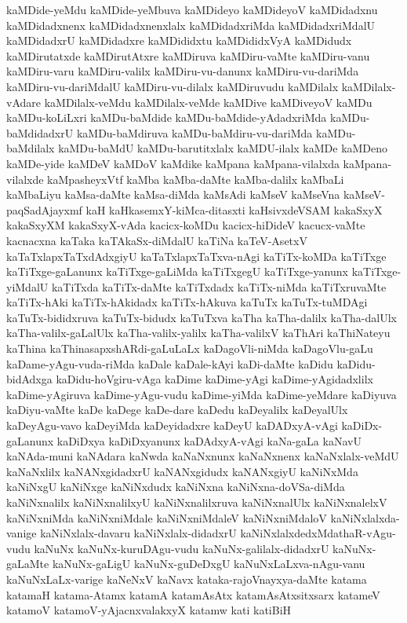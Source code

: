 {kaMDide-yeMdu
kaMDide-yeMbuva
kaMDideyo
kaMDideyoV
kaMDidadxnu
kaMDidadxnenx
kaMDidadxnenxlalx
kaMDidadxriMda
kaMDidadxriMdalU
kaMDidadxrU
kaMDidadxre
kaMDididxtu
kaMDididxVyA
kaMDidudx
kaMDirutatxde
kaMDirutAtxre
kaMDiruva
kaMDiru-vaMte
kaMDiru-vanu
kaMDiru-varu
kaMDiru-valilx
kaMDiru-vu-danunx
kaMDiru-vu-dariMda
kaMDiru-vu-dariMdalU
kaMDiru-vu-dilalx
kaMDiruvudu
kaMDilalx
kaMDilalx-vAdare
kaMDilalx-veMdu
kaMDilalx-veMde
kaMDive
kaMDiveyoV
kaMDu
kaMDu-koLiLxri
kaMDu-baMdide
kaMDu-baMdide-yAdadxriMda
kaMDu-baMdidadxrU
kaMDu-baMdiruva
kaMDu-baMdiru-vu-dariMda
kaMDu-baMdilalx
kaMDu-baMdU
kaMDu-barutitxlalx
kaMDU-ilalx
kaMDe
kaMDeno
kaMDe-yide
kaMDeV
kaMDoV
kaMdike
kaMpana
kaMpana-vilalxda
kaMpana-vilalxde
kaMpasheyxVtf
kaMba
kaMba-daMte
kaMba-dalilx
kaMbaLi
kaMbaLiyu
kaMsa-daMte
kaMsa-diMda
kaMsAdi
kaMseV
kaMseVna
kaMseV-paqSadAjayxmf
kaH
kaHkasemxY-kiMca-ditasxti
kaHsivxdeVSAM
kakaSxyX
kakaSxyXM
kakaSxyX-vAda
kacicx-koMDu
kacicx-hiDideV
kacucx-vaMte
kacnacxna
kaTaka
kaTAkaSx-diMdalU
kaTiNa
kaTeV-AsetxV
kaTaTxlapxTaTxdAdxgiyU
kaTaTxlapxTaTxva-nAgi
kaTiTx-koMDa
kaTiTxge
kaTiTxge-gaLanunx
kaTiTxge-gaLiMda
kaTiTxgegU
kaTiTxge-yanunx
kaTiTxge-yiMdalU
kaTiTxda
kaTiTx-daMte
kaTiTxdadx
kaTiTx-niMda
kaTiTxruvaMte
kaTiTx-hAki
kaTiTx-hAkidadx
kaTiTx-hAkuva
kaTuTx
kaTuTx-tuMDAgi
kaTuTx-bididxruva
kaTuTx-bidudx
kaTuTxva
kaTha
kaTha-dalilx
kaTha-dalUlx
kaTha-valilx-gaLalUlx
kaTha-valilx-yalilx
kaTha-valilxV
kaThAri
kaThiNateyu
kaThina
kaThinasapxshARdi-gaLuLaLx
kaDagoVli-niMda
kaDagoVlu-gaLu
kaDame-yAgu-vuda-riMda
kaDale
kaDale-kAyi
kaDi-daMte
kaDidu
kaDidu-bidAdxga
kaDidu-hoVgiru-vAga
kaDime
kaDime-yAgi
kaDime-yAgidadxlilx
kaDime-yAgiruva
kaDime-yAgu-vudu
kaDime-yiMda
kaDime-yeMdare
kaDiyuva
kaDiyu-vaMte
kaDe
kaDege
kaDe-dare
kaDedu
kaDeyalilx
kaDeyalUlx
kaDeyAgu-vavo
kaDeyiMda
kaDeyidadxre
kaDeyU
kaDADxyA-vAgi
kaDiDx-gaLanunx
kaDiDxya
kaDiDxyanunx
kaDAdxyA-vAgi
kaNa-gaLa
kaNavU
kaNAda-muni
kaNAdara
kaNwda
kaNaNxnunx
kaNaNxnenx
kaNaNxlalx-veMdU
kaNaNxlilx
kaNANxgidadxrU
kaNANxgidudx
kaNANxgiyU
kaNiNxMda
kaNiNxgU
kaNiNxge
kaNiNxdudx
kaNiNxna
kaNiNxna-doVSa-diMda
kaNiNxnalilx
kaNiNxnalilxyU
kaNiNxnalilxruva
kaNiNxnalUlx
kaNiNxnalelxV
kaNiNxniMda
kaNiNxniMdale
kaNiNxniMdaleV
kaNiNxniMdaloV
kaNiNxlalxda-vanige
kaNiNxlalx-davaru
kaNiNxlalx-didadxrU
kaNiNxlalxdedxMdathaR-vAgu-vudu
kaNuNx
kaNuNx-kuruDAgu-vudu
kaNuNx-galilalx-didadxrU
kaNuNx-gaLaMte
kaNuNx-gaLigU
kaNuNx-guDeDxgU
kaNuNxLaLxva-nAgu-vanu
kaNuNxLaLx-varige
kaNeNxV
kaNavx
kataka-rajoVnayxya-daMte
katama
katamaH
katama-Atamx
katamA
katamAsAtx
katamAsAtxsitxsarx
katameV
katamoV
katamoV-yAjacnxvalakxyX
katamw
kati
katiBiH
}
